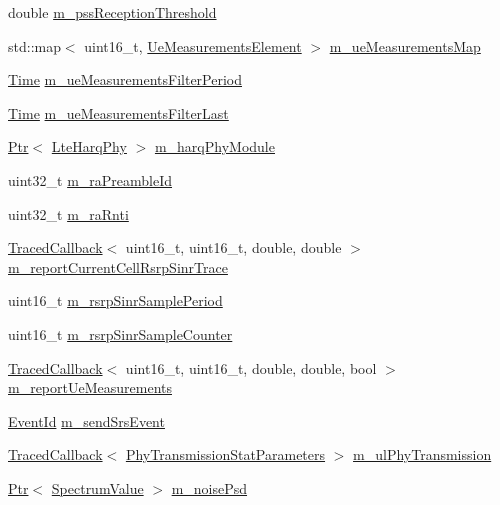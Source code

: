 \begin{DoxyCompactItemize}
double \hyperlink{classns3_1_1LteUePhy_af32a732f17a4d74ccd03b03471b5e1d3}{m\+\_\+pss\+Reception\+Threshold}
\item 
std\+::map$<$ uint16\+\_\+t, \hyperlink{structns3_1_1LteUePhy_1_1UeMeasurementsElement}{Ue\+Measurements\+Element} $>$ \hyperlink{classns3_1_1LteUePhy_a3d064f4bdc58614aa1e12c44a8ec111b}{m\+\_\+ue\+Measurements\+Map}
\item 
\hyperlink{classns3_1_1Time}{Time} \hyperlink{classns3_1_1LteUePhy_acb16dbec02523a0642f73eb98292ed2f}{m\+\_\+ue\+Measurements\+Filter\+Period}
\item 
\hyperlink{classns3_1_1Time}{Time} \hyperlink{classns3_1_1LteUePhy_a075d805213fceb00b0298b183d68f157}{m\+\_\+ue\+Measurements\+Filter\+Last}
\item 
\hyperlink{classns3_1_1Ptr}{Ptr}$<$ \hyperlink{classns3_1_1LteHarqPhy}{Lte\+Harq\+Phy} $>$ \hyperlink{classns3_1_1LteUePhy_a9dcf48a436307726a8a1c6ce697983d8}{m\+\_\+harq\+Phy\+Module}
\item 
uint32\+\_\+t \hyperlink{classns3_1_1LteUePhy_af3baaa1596e4ac3218a84129e65c1d78}{m\+\_\+ra\+Preamble\+Id}
\item 
uint32\+\_\+t \hyperlink{classns3_1_1LteUePhy_affe6f8e8fcf03482b57c92c74637cc4e}{m\+\_\+ra\+Rnti}
\item 
\hyperlink{classns3_1_1TracedCallback}{Traced\+Callback}$<$ uint16\+\_\+t, uint16\+\_\+t, double, double $>$ \hyperlink{classns3_1_1LteUePhy_aded24128cc664f9a3ef6e70d3c3fc430}{m\+\_\+report\+Current\+Cell\+Rsrp\+Sinr\+Trace}
\item 
uint16\+\_\+t \hyperlink{classns3_1_1LteUePhy_a850c3c3e0a9f23f2907a2a6647a23f84}{m\+\_\+rsrp\+Sinr\+Sample\+Period}
\item 
uint16\+\_\+t \hyperlink{classns3_1_1LteUePhy_a1b0a01c9da8427095d325cc12b0cdccb}{m\+\_\+rsrp\+Sinr\+Sample\+Counter}
\item 
\hyperlink{classns3_1_1TracedCallback}{Traced\+Callback}$<$ uint16\+\_\+t, uint16\+\_\+t, double, double, bool $>$ \hyperlink{classns3_1_1LteUePhy_a6441358870b99ebb18253bc646702af9}{m\+\_\+report\+Ue\+Measurements}
\item 
\hyperlink{classns3_1_1EventId}{Event\+Id} \hyperlink{classns3_1_1LteUePhy_aa5d34457c03a8a5d276546f800b41ab6}{m\+\_\+send\+Srs\+Event}
\item 
\hyperlink{classns3_1_1TracedCallback}{Traced\+Callback}$<$ \hyperlink{structns3_1_1PhyTransmissionStatParameters}{Phy\+Transmission\+Stat\+Parameters} $>$ \hyperlink{classns3_1_1LteUePhy_ac202a6c628e4657e46db7746728b1162}{m\+\_\+ul\+Phy\+Transmission}
\item 
\hyperlink{classns3_1_1Ptr}{Ptr}$<$ \hyperlink{classns3_1_1SpectrumValue}{Spectrum\+Value} $>$ \hyperlink{classns3_1_1LteUePhy_a527313b878e5c3103a76bedf25ea3f5c}{m\+\_\+noise\+Psd}
\end{DoxyCompactItemize}

